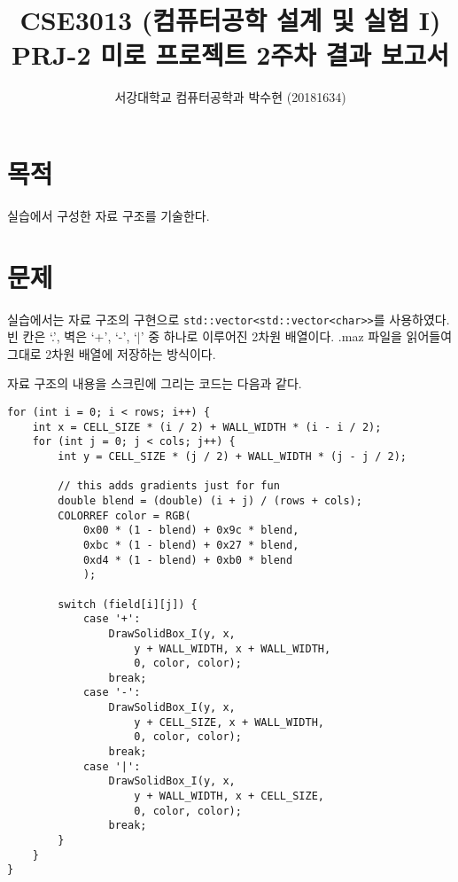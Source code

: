 
\newcommand{\norm}[1]{\left\lVert#1\right\rVert}



\title{CSE3013 (컴퓨터공학 설계 및 실험 I) \space \newline PRJ-2 미로 프로젝트 2주차 결과 보고서}
\author{서강대학교 컴퓨터공학과 박수현 (20181634)}
\maketitle

\section{목적}
실습에서 구성한 자료 구조를 기술한다.

\section{문제}
실습에서는 자료 구조의 구현으로 \texttt{std::vector<std::vector<char>>}를 사용하였다. 빈 칸은 `.', 벽은 `+', `-', `$|$' 중 하나로
이루어진 2차원 배열이다. .maz 파일을 읽어들여 그대로 2차원 배열에 저장하는 방식이다.

자료 구조의 내용을 스크린에 그리는 코드는 다음과 같다.
\begin{verbatim}
for (int i = 0; i < rows; i++) {
    int x = CELL_SIZE * (i / 2) + WALL_WIDTH * (i - i / 2);
    for (int j = 0; j < cols; j++) {
        int y = CELL_SIZE * (j / 2) + WALL_WIDTH * (j - j / 2);

        // this adds gradients just for fun
        double blend = (double) (i + j) / (rows + cols);
        COLORREF color = RGB(
            0x00 * (1 - blend) + 0x9c * blend,
            0xbc * (1 - blend) + 0x27 * blend,
            0xd4 * (1 - blend) + 0xb0 * blend
            );

        switch (field[i][j]) {
            case '+':
                DrawSolidBox_I(y, x,
                    y + WALL_WIDTH, x + WALL_WIDTH,
                    0, color, color);
                break;
            case '-':
                DrawSolidBox_I(y, x,
                    y + CELL_SIZE, x + WALL_WIDTH,
                    0, color, color);
                break;
            case '|':
                DrawSolidBox_I(y, x,
                    y + WALL_WIDTH, x + CELL_SIZE,
                    0, color, color);
                break;
        }
    }
}
\end{verbatim}

